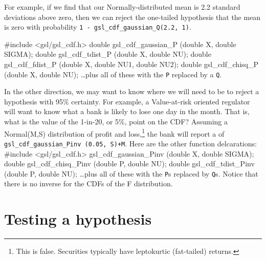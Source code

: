 For example, if we find that our Normally-distributed mean is 2.2 standard
deviations above zero, then we can reject the one-tailed hypothesis that
the mean is zero with probability {\tt 1 - gsl\_cdf\_gaussian\_Q(2.2, 1)}.

#include <gsl/gsl_cdf.h>
double gsl_cdf_gaussian_P (double X, double SIGMA);
double gsl_cdf_tdist_P (double X, double NU);
double gsl_cdf_fdist_P (double X, double NU1, double NU2);
double gsl_cdf_chisq_P (double X, double NU);
\dots plus all of these with the {\tt P} replaced by a {\tt Q}.


In the other direction, we may want to know where we will need to be to reject a hypothesis with 95\%
certainty. For example, a Value-at-risk oriented regulator will want to know what a bank is likely to lose 
one day in the month. That is, what is the value of the 1-in-20, or 5\%, point on the CDF?
Assuming a Normal(M,S) distribution of profit and loss,\footnote{This is false. Securities
typically have leptokurtic (fat-tailed) returns.} the bank will report a  of {\tt
gsl\_cdf\_gaussian\_Pinv (0.05, S)+M}. Here are the other function delcarations:
#include <gsl/gsl_cdf.h>
gsl_cdf_gaussian_Pinv (double X, double SIGMA);
double gsl_cdf_chisq_Pinv (double P, double NU);
double gsl_cdf_tdist_Pinv (double P, double NU);
\dots plus all of these with the {\tt P}s replaced by {\tt Q}s.
Notice that there is no inverse for the CDFs of the F distribution.


\section{Testing a hypothesis}




